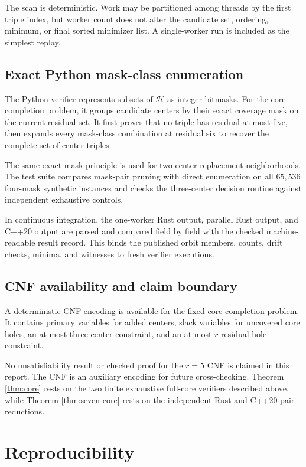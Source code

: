\documentclass[11pt]{article}
\newcommand{\Hspace}{\mathcal{H}}
\begin{document}
The scan is deterministic.  Work may be partitioned among threads by the
first triple index, but worker count does not alter the candidate set,
ordering, minimum, or final sorted minimizer list.  A single-worker run
is included as the simplest replay.

\subsection{Exact Python mask-class enumeration}

The Python verifier represents subsets of \(\Hspace\) as integer
bitmasks.  For the core-completion problem, it groups candidate centers
by their exact coverage mask on the current residual set.  It first
proves that no triple has residual at most five, then expands every
mask-class combination at residual six to recover the complete set of
center triples.

The same exact-mask principle is used for two-center replacement
neighborhoods.  The test suite compares mask-pair pruning with direct
enumeration on all \(65{,}536\) four-mask synthetic instances and checks
the three-center decision routine against independent exhaustive
controls.

In continuous integration, the one-worker Rust output, parallel Rust
output, and C++20 output are parsed and compared field by field with the
checked machine-readable result record.  This binds the published orbit
members, counts, drift checks, minima, and witnesses to fresh verifier
executions.

\subsection{CNF availability and claim boundary}

A deterministic CNF encoding is available for the fixed-core completion
problem.  It contains primary variables for added centers, slack
variables for uncovered core holes, an at-most-three center constraint,
and an at-most-\(r\) residual-hole constraint.

No unsatisfiability result or checked proof for the \(r=5\) CNF is
claimed in this report.  The CNF is an auxiliary encoding for future
cross-checking.  Theorem \ref{thm:core} rests on the two finite exhaustive
full-core verifiers described above, while Theorem \ref{thm:seven-core}
rests on the independent Rust and C++20 pair reductions.

\section{Reproducibility}
\end{document}
